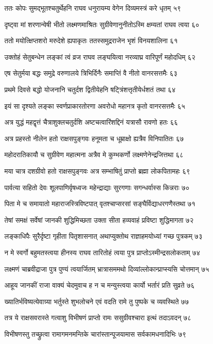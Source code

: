 ततः कोपः सुमद्भूतश्चतुर्थेहनि राघव
धनुरायम्य वेगेन दिव्यमस्त्रं करे धृतम् ५९

दृष्ट्वा मां शरणान्वेषी भीतो लक्ष्मणमाश्रितः
सुग्रीवेणानुनीतोऽस्मि क्षम्यतां राघव त्वया ६०

ततो मयोत्क्षिप्तशरो मरुदेशे ह्यपाकृतः
ततस्समुद्रराजेन भृशं विनयशालिना ६१

उक्तोहं सेतुबन्धेन लङ्कां त्वं व्रज राघव
लङ्घयित्वा नरव्याघ्र वारिपूर्णं महोदधिम् ६२

एष सेतुर्मया बद्धः समुद्रे वरुणालये
त्रिभिर्दिनैः समाप्तिं वै नीतो वानरसत्तमैः ६३

प्रथमे दिवसे बद्धो योजनानि चतुर्दश
द्वितीयेहनि षट्त्रिंशत्तृतीयेर्धशतं तथा ६४

इयं सा दृश्यते लङ्का स्वर्णप्राकारतोरणा
अवरोधो महानत्र कृतो वानरसत्तमैः ६५

अत्र युद्धं महद्वृत्तं चैत्राशुक्लचतुर्दशि
अष्टचत्वारिंशद्दिनं यत्रासौ रावणो हतः ६६

अत्र प्रहस्तो नीलेन हतो राक्षसपुङ्गवः
हनूमता च धूम्राक्षो ह्यत्रैव विनिपातितः ६७

महोदरातिकायौ च सुग्रीवेण महात्मना
अत्रैव मे कुम्भकर्णो लक्ष्मणेनेन्द्रजित्तथा ६८

मया चात्र दशग्रीवो हतो राक्षसपुङ्गवः
अत्र सम्भाषितुं प्राप्तो ब्रह्मा लोकपितामहः ६९

पार्वत्या सहितो देवः शूलपाणिर्वृषध्वजः
महेन्द्राद्याः सुरगणाः सगन्धर्वास्स किन्नराः ७०

पिता मे च समायातो महाराजस्त्रिविष्टपात्
वृतश्चाप्सरसां सङ्घैर्विद्याधरगणैस्तथा ७१

तेषां समक्षं सर्वेषां जानकी शुद्धिमिच्छता
उक्ता सीता हव्यवाहं प्रविष्टा शुद्धिमागता ७२

लङ्काधिपैः सुरैर्दृष्टा गृहीता पितृशासनात्
अथाप्युक्तोथ राज्ञाहमयोध्यां गच्छ पुत्रकम् ७३

न मे स्वर्गो बहुमतस्त्वया हीनस्य राघव
तारितोहं त्वया पुत्र प्राप्तोऽस्मीन्द्रसलोकताम् ७४

लक्ष्मणं चाब्रवीद्राजा पुत्र पुण्यं त्वयार्जितम्
भ्रात्रासममथो दिव्यांल्लोकान्प्राप्स्यसि चोत्तमान् ७५

आहूय जानकीं राजा वाक्यं चेदमुवाच ह
न च मन्युस्त्वया कार्यो भर्तारं प्रति सुव्रते ७६

ख्यातिर्भविष्यत्येवाग्र्या भर्तुस्ते शुभलोचने
एवं वदति रामे तु पुष्पके च व्यवस्थिते ७७

तत्र ये राक्षसवरास्ते गत्वाशु विभीषणं
प्राप्तो रामः ससुग्रीवश्चारा इत्थं तदाऽवदन् ७८

विभीषणस्तु तच्छ्रुत्वा रामागमनमन्तिके
चारांस्तान्पूजयामास सर्वकामधनादिभिः ७९

